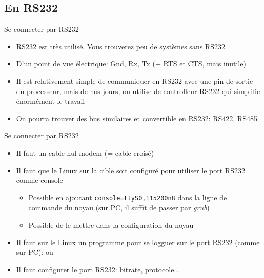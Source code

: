 \subsection{En RS232}

\begin{frame}{Se connecter par RS232}
  \begin{itemize}
  \item RS232  est très utilisé.  Vous trouverez peu de  systèmes sans
    RS232
  \item D'un point de vue électrique:  Gnd, Rx, Tx (+ RTS et CTS, mais
    inutile)
  \item Il  est relativement simple  de communiquer en RS232  avec une
    pin  de sortie du  processeur, mais  de nos  jours, on  utilise de
    controlleur RS232 qui simplifie énormément le travail
  \item On pourra trouver des  bus similaires et convertible en RS232:
    RS422, RS485
  \end{itemize}
\end{frame}

\begin{frame}{Se connecter par RS232}
  \begin{itemize}
  \item Il faut un cable nul modem (= cable croisé)
  \item Il faut que le Linux sur la cible soit configuré pour utiliser
    le port RS232 comme console
    \begin{itemize}
    \item Possible en ajoutant \texttt{console=ttyS0,115200n8} dans la
      ligne  de commande du  noyau (sur  PC, il  suffit de  passer par
      \emph{grub}) 
    \item Possible de le mettre dans la configuration du noyau
    \end{itemize}
  \item Il faut sur le Linux  un programme pour se logguer sur le port
    RS232 (comme sur PC):  ou 
  \item Il faut configurer le port RS232: bitrate, protocole...
  \end{itemize}
\end{frame}

